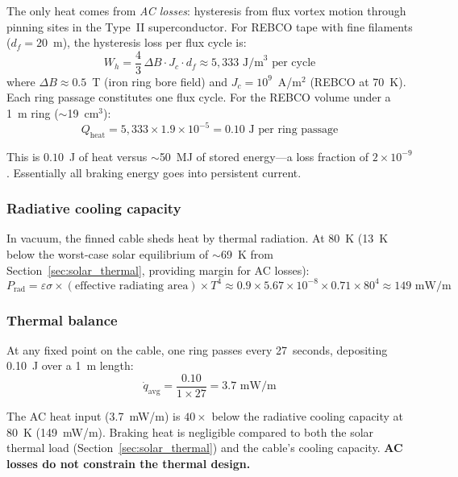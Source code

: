 \documentclass[12pt,letterpaper]{article}
\begin{document}
The only heat comes from \emph{AC losses}: hysteresis from flux vortex motion through pinning sites in the Type~II superconductor. For REBCO tape with fine filaments ($d_f = 20$~\textmu m), the hysteresis loss per flux cycle is:
\begin{equation}
W_h = \frac{4}{3} \, \Delta B \cdot J_c \cdot d_f \approx 5{,}333 \text{~J/m}^3 \text{ per cycle}
\end{equation}
where $\Delta B \approx 0.5$~T (iron ring bore field) and $J_c = 10^9$~A/m$^2$ (REBCO at 70~K). Each ring passage constitutes one flux cycle. For the REBCO volume under a 1~m ring ($\sim$19~cm$^3$):
\begin{equation}
Q_{\text{heat}} = 5{,}333 \times 1.9 \times 10^{-5} = 0.10 \text{~J per ring passage}
\end{equation}

This is $0.10$~J of heat versus $\sim$50~MJ of stored energy---a loss fraction of $2 \times 10^{-9}$. Essentially all braking energy goes into persistent current.

\subsubsection{Radiative cooling capacity}

In vacuum, the finned cable sheds heat by thermal radiation. At 80~K (13~K below the worst-case solar equilibrium of ${\sim}$69~K from Section~\ref{sec:solar_thermal}, providing margin for AC losses):
\begin{equation}
P_{\text{rad}} = \varepsilon \sigma \times (\text{effective radiating area}) \times T^4 \approx 0.9 \times 5.67 \times 10^{-8} \times 0.71 \times 80^4 \approx 149 \text{~mW/m}
\end{equation}

\subsubsection{Thermal balance}

At any fixed point on the cable, one ring passes every 27~seconds, depositing 0.10~J over a 1~m length:
\begin{equation}
\dot{q}_{\text{avg}} = \frac{0.10}{1 \times 27} = 3.7 \text{~mW/m}
\end{equation}

The AC heat input (3.7~mW/m) is $40\times$ below the radiative cooling capacity at 80~K (149~mW/m). Braking heat is negligible compared to both the solar thermal load (Section~\ref{sec:solar_thermal}) and the cable's cooling capacity. \textbf{AC losses do not constrain the thermal design.}
\end{document}
